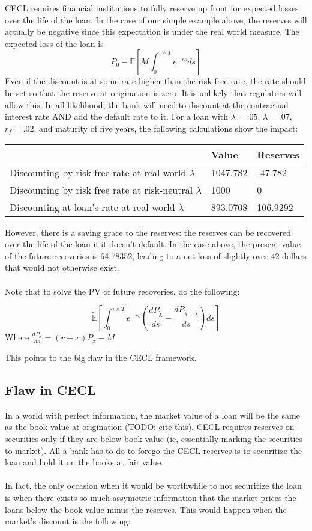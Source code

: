\documentclass{article}
\begin{document}
CECL requires financial institutions to fully reserve up front for expected losses over the life of the loan. In the case of our simple example above, the reserves will actually be negative since this expectation is under the real world measure.  The expected loss of the loan is 
\[P_0-\mathbb{E}[M\int_0^{\tau \wedge T} e^{-rs} ds]\] 
Even if the discount is at some rate higher than the risk free rate, the rate should be set so that the reserve at origination is zero.  It is unlikely that regulators will allow this.  In all likelihood, the bank will need to discount at the contractual interest rate AND add the default rate to it.  For a loan with \(\lambda=.05\), \(\tilde{\lambda}=.07\), \(r_f=.02\), and maturity of five years, the following calculations show the impact: 

\begin{tabular}{l|l|l}
  & Value & Reserves \\
  \hline
  Discounting by risk free rate at real world \(\lambda\) &  1047.782 & -47.782 \\
  Discounting by risk free rate at risk-neutral \(\lambda\) & 1000 & 0 \\
  Discounting at loan's rate at real world \(\lambda\) & 893.0708 & 106.9292 \\
  \hline
\end{tabular}

However, there is a saving grace to the reserves: the reserves can be recovered over the life of the loan if it doesn't default.  In the case above, the present value of the future recoveries is 64.78352, leading to a net loss of slightly over 42 dollars that would not otherwise exist.
\\
\\
Note that to solve the PV of future recoveries, do the following:

\[\mathbb{\tilde{E}}\left[\int_0^{\tau \wedge T} e^{-rs}\left(\frac{dP_{\tilde{\lambda}}}{ds}-\frac{dP_{\tilde{\lambda}+\lambda}}{ds}\right) ds\right]\]
Where \(\frac{dP_{x}}{ds}=(r+x)P_{x}-M\)


This points to the big flaw in the CECL framework.  

\subsection{Flaw in CECL}

In a world with perfect information, the market value of a loan will be the same as the book value at origination (TODO: cite this).  CECL requires reserves on securities only if they are below book value (ie, essentially marking the securities to market).  All a bank has to do to forego the CECL reserves is to securitize the loan and hold it on the books at fair value.  
\\
\\
In fact, the only occasion when it would be worthwhile to not securitize the loan is when there exists so much assymetric information that the market prices the loans below the book value minus the reserves.  This would happen when the market's discount is the following:
\end{document}
